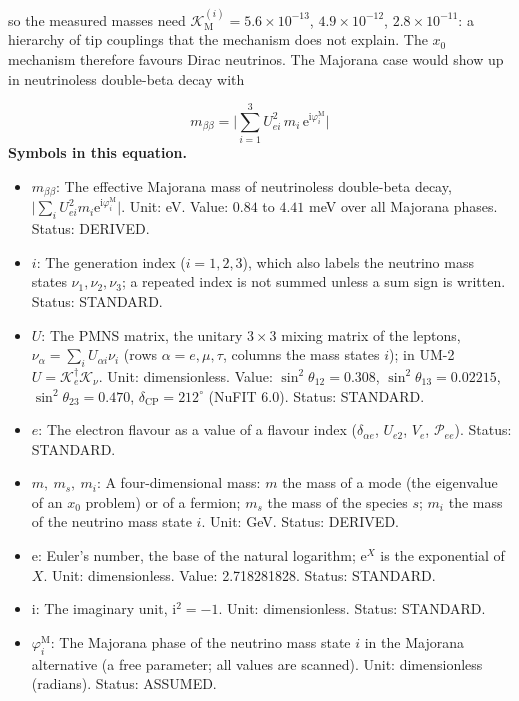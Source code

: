 \documentclass[
  10pt,
]{article}
\providecommand{\tightlist}{%
  \setlength{\itemsep}{0pt}\setlength{\parskip}{0pt}}
\begin{document}
so the measured masses need
\(\mathcal{K}_{\mathrm{M}}^{(i)} = 5.6\times10^{-13}\),
\(4.9\times10^{-12}\), \(2.8\times10^{-11}\): a hierarchy of tip
couplings that the mechanism does not explain. The \(x_0\) mechanism
therefore favours Dirac neutrinos. The Majorana case would show up in
neutrinoless double-beta decay with

\[ m_{\beta\beta} = \Big\lvert\sum_{i=1}^{3}U_{ei}^2\,m_i\,\mathrm{e}^{\mathrm{i}\varphi^{\mathrm{M}}_i}\Big\rvert \]
\textbf{Symbols in this equation.}

\begin{itemize}
\tightlist
\item
  \(m_{\beta\beta}\): The effective Majorana mass of neutrinoless
  double-beta decay,
  \(\lvert\sum_iU_{ei}^2m_i\mathrm{e}^{\mathrm{i}\varphi^{\mathrm{M}}_i}\rvert\).
  Unit: eV. Value: \(0.84\) to \(4.41\) meV over all Majorana phases.
  Status: DERIVED.
\item
  \(i\): The generation index (\(i = 1, 2, 3\)), which also labels the
  neutrino mass states \(\nu_1, \nu_2, \nu_3\); a repeated index is not
  summed unless a sum sign is written. Status: STANDARD.
\item
  \(U\): The PMNS matrix, the unitary \(3 \times 3\) mixing matrix of
  the leptons, \(\nu_\alpha = \sum_iU_{\alpha i}\nu_i\) (rows
  \(\alpha = e, \mu, \tau\), columns the mass states \(i\)); in UM-2
  \(U = \mathcal{K}_e^\dagger\mathcal{K}_\nu\). Unit: dimensionless.
  Value: \(\sin^2\theta_{12} = 0.308\), \(\sin^2\theta_{13} = 0.02215\),
  \(\sin^2\theta_{23} = 0.470\), \(\delta_{\mathrm{CP}} = 212^\circ\)
  (NuFIT 6.0). Status: STANDARD.
\item
  \(e\): The electron flavour as a value of a flavour index
  (\(\delta_{\alpha e}\), \(U_{e2}\), \(V_e\), \(\mathcal{P}_{ee}\)).
  Status: STANDARD.
\item
  \(m,\ m_s,\ m_i\): A four-dimensional mass: \(m\) the mass of a mode
  (the eigenvalue of an \(x_0\) problem) or of a fermion; \(m_s\) the
  mass of the species \(s\); \(m_i\) the mass of the neutrino mass state
  \(i\). Unit: GeV. Status: DERIVED.
\item
  \(\mathrm{e}\): Euler's number, the base of the natural logarithm;
  \(\mathrm{e}^{X}\) is the exponential of \(X\). Unit: dimensionless.
  Value: 2.718281828. Status: STANDARD.
\item
  \(\mathrm{i}\): The imaginary unit, \(\mathrm{i}^2 = -1\). Unit:
  dimensionless. Status: STANDARD.
\item
  \(\varphi^{\mathrm{M}}_i\): The Majorana phase of the neutrino mass
  state \(i\) in the Majorana alternative (a free parameter; all values
  are scanned). Unit: dimensionless (radians). Status: ASSUMED.
\end{itemize}
\end{document}
